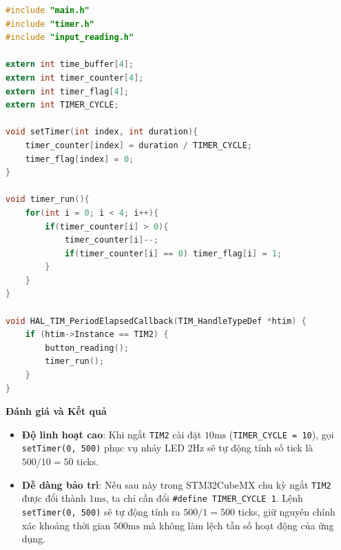 \begin{lstlisting}[language=C, caption={Khởi động ngắt Timer 2 trong main.c}]
#include "main.h"
#include "timer.h"
#include "input_reading.h"

extern int time_buffer[4];
extern int timer_counter[4];
extern int timer_flag[4];
extern int TIMER_CYCLE;

void setTimer(int index, int duration){
    timer_counter[index] = duration / TIMER_CYCLE;
    timer_flag[index] = 0;
}

void timer_run(){
    for(int i = 0; i < 4; i++){
        if(timer_counter[i] > 0){
            timer_counter[i]--;
            if(timer_counter[i] == 0) timer_flag[i] = 1;
        }
    }
}

void HAL_TIM_PeriodElapsedCallback(TIM_HandleTypeDef *htim) {
    if (htim->Instance == TIM2) {
        button_reading();
        timer_run();
    }
}
\end{lstlisting}




\textbf{Đánh giá và Kết quả}
\begin{itemize}
    \item \textbf{Độ linh hoạt cao}: Khi ngắt \texttt{TIM2} cài đặt $10\text{ms}$ (\texttt{TIMER\_CYCLE = 10}), gọi \texttt{setTimer(0, 500)} phục vụ nháy LED $2\text{Hz}$ sẽ tự động tính số tick là $500 / 10 = 50$ ticks.
    \item \textbf{Dễ dàng bảo trì}: Nếu sau này trong STM32CubeMX chu kỳ ngắt \texttt{TIM2} được đổi thành $1\text{ms}$, ta chỉ cần đổi \texttt{\#define TIMER\_CYCLE 1}. Lệnh \texttt{setTimer(0, 500)} sẽ tự động tính ra $500 / 1 = 500$ ticks, giữ nguyên chính xác khoảng thời gian $500\text{ms}$ mà không làm lệch tần số hoạt động của ứng dụng.
\end{itemize}